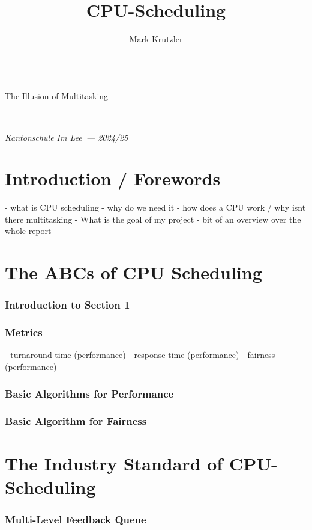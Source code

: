 \documentclass{report}
\title{CPU-Scheduling}
\author{Mark Krutzler}
\newcommand{\thesubtitle}{The Illusion of Multitasking}
\newcommand{\currentdate}{2024/25}
\newcommand{\auinstitution}{Kantonschule Im Lee}
\renewcommand{\maketitle}{
\begin{center}


{\Huge\bfseries
\thetitle}
\vspace{0.5em}\\
{\LARGE\thesubtitle}


{\rule{0.4\textwidth}{.4pt}}

{\bfseries \theauthor}\\
\textit{\auinstitution \ --- \currentdate}
\end{center}
}
\begin{document}
\begin{titlepage}
\vspace*{\fill}
\centering
\maketitle
\vspace*{\fill}
\end{titlepage}

\tableofcontents



\part{Introduction / Forewords}

- what is CPU scheduling
- why do we need it
    - how does a CPU work / why isnt there multitasking
- What is the goal of my project
- bit of an overview over the whole report



\part{The ABCs of CPU Scheduling}

\section{Introduction to Section 1}

\section{Metrics}
    - turnaround time (performance)
    - response time (performance)
    - fairness (performance)

\section{Basic Algorithms for Performance}

\section{Basic Algorithm for Fairness}


\part{The Industry Standard of CPU-Scheduling}

\section{Multi-Level Feedback Queue}
\end{document}
